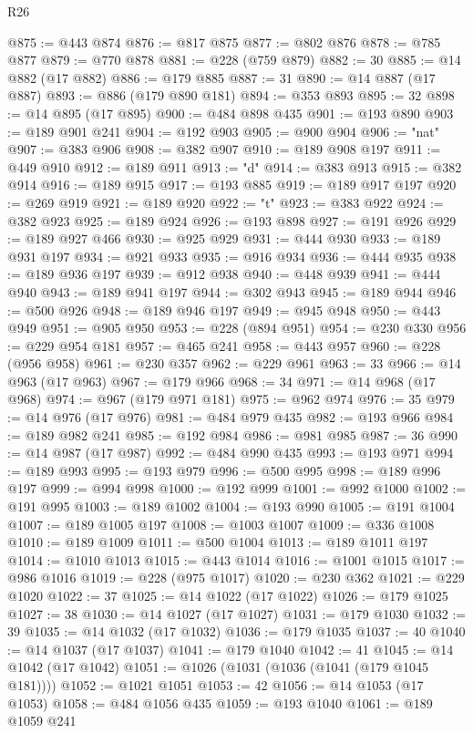 \begin{lexlean}{R26}
\begin{coremodule}
@875 := @443 @874
@876 := @817 @875
@877 := @802 @876
@878 := @785 @877
@879 := @770 @878
@881 := @228 (@759 @879)
@882 := 30
@885 := @14 @882 (@17 @882)
@886 := @179 @885
@887 := 31
@890 := @14 @887 (@17 @887)
@893 := @886 (@179 @890 @181)
@894 := @353 @893
@895 := 32
@898 := @14 @895 (@17 @895)
@900 := @484 @898 @435
@901 := @193 @890
@903 := @189 @901 @241
@904 := @192 @903
@905 := @900 @904
@906 := "nat"
@907 := @383 @906
@908 := @382 @907
@910 := @189 @908 @197
@911 := @449 @910
@912 := @189 @911
@913 := "d"
@914 := @383 @913
@915 := @382 @914
@916 := @189 @915
@917 := @193 @885
@919 := @189 @917 @197
@920 := @269 @919
@921 := @189 @920
@922 := "t"
@923 := @383 @922
@924 := @382 @923
@925 := @189 @924
@926 := @193 @898
@927 := @191 @926
@929 := @189 @927 @466
@930 := @925 @929
@931 := @444 @930
@933 := @189 @931 @197
@934 := @921 @933
@935 := @916 @934
@936 := @444 @935
@938 := @189 @936 @197
@939 := @912 @938
@940 := @448 @939
@941 := @444 @940
@943 := @189 @941 @197
@944 := @302 @943
@945 := @189 @944
@946 := @500 @926
@948 := @189 @946 @197
@949 := @945 @948
@950 := @443 @949
@951 := @905 @950
@953 := @228 (@894 @951)
@954 := @230 @330
@956 := @229 @954 @181
@957 := @465 @241
@958 := @443 @957
@960 := @228 (@956 @958)
@961 := @230 @357
@962 := @229 @961
@963 := 33
@966 := @14 @963 (@17 @963)
@967 := @179 @966
@968 := 34
@971 := @14 @968 (@17 @968)
@974 := @967 (@179 @971 @181)
@975 := @962 @974
@976 := 35
@979 := @14 @976 (@17 @976)
@981 := @484 @979 @435
@982 := @193 @966
@984 := @189 @982 @241
@985 := @192 @984
@986 := @981 @985
@987 := 36
@990 := @14 @987 (@17 @987)
@992 := @484 @990 @435
@993 := @193 @971
@994 := @189 @993
@995 := @193 @979
@996 := @500 @995
@998 := @189 @996 @197
@999 := @994 @998
@1000 := @192 @999
@1001 := @992 @1000
@1002 := @191 @995
@1003 := @189 @1002
@1004 := @193 @990
@1005 := @191 @1004
@1007 := @189 @1005 @197
@1008 := @1003 @1007
@1009 := @336 @1008
@1010 := @189 @1009
@1011 := @500 @1004
@1013 := @189 @1011 @197
@1014 := @1010 @1013
@1015 := @443 @1014
@1016 := @1001 @1015
@1017 := @986 @1016
@1019 := @228 (@975 @1017)
@1020 := @230 @362
@1021 := @229 @1020
@1022 := 37
@1025 := @14 @1022 (@17 @1022)
@1026 := @179 @1025
@1027 := 38
@1030 := @14 @1027 (@17 @1027)
@1031 := @179 @1030
@1032 := 39
@1035 := @14 @1032 (@17 @1032)
@1036 := @179 @1035
@1037 := 40
@1040 := @14 @1037 (@17 @1037)
@1041 := @179 @1040
@1042 := 41
@1045 := @14 @1042 (@17 @1042)
@1051 := @1026 (@1031 (@1036 (@1041 (@179 @1045 @181))))
@1052 := @1021 @1051
@1053 := 42
@1056 := @14 @1053 (@17 @1053)
@1058 := @484 @1056 @435
@1059 := @193 @1040
@1061 := @189 @1059 @241

\end{coremodule}
\end{lexlean}
